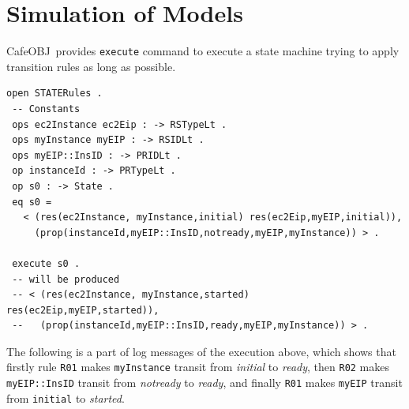 \documentclass[12pt]{report}
\newcommand{\cafeobj}{{\sf CafeOBJ}~}
\begin{document}
\section{Simulation of Models}
\label{sec:simulation}
\cafeobj provides {\tt execute} command to execute a state machine
trying to apply transition rules as long as possible.
\begin{verbatim}
open STATERules .
 -- Constants
 ops ec2Instance ec2Eip : -> RSTypeLt .
 ops myInstance myEIP : -> RSIDLt .
 ops myEIP::InsID : -> PRIDLt .
 op instanceId : -> PRTypeLt .
 op s0 : -> State .
 eq s0 =
   < (res(ec2Instance, myInstance,initial) res(ec2Eip,myEIP,initial)),
     (prop(instanceId,myEIP::InsID,notready,myEIP,myInstance)) > .
      
 execute s0 . 
 -- will be produced 
 -- < (res(ec2Instance, myInstance,started) res(ec2Eip,myEIP,started)),
 --   (prop(instanceId,myEIP::InsID,ready,myEIP,myInstance)) > .
\end{verbatim}
The following is a part of log messages of the execution above, which
shows that firstly rule {\tt R01} makes {\tt myInstance} transit
from {\it initial} to {\it ready}, then {\tt R02} makes
{\tt myEIP::InsID} transit from {\it notready} to {\it ready}, and
finally {\tt R01} makes {\tt myEIP} transit from {\tt initial} to
{\it started}.
\end{document}
